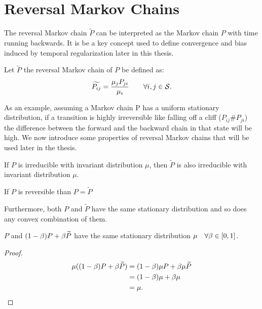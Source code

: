 \section{Reversal Markov Chains}
The reversal Markov chain $\widetilde{P}$ can be interpreted as the Markov chain $P$ with time running backwards. It is be a key concept used to define convergence and bias induced by temporal regularization later in this thesis. 
\begin{definition}
Let $\widetilde{P}$ the reversal Markov chain of $P$ be defined as:
\begin{equation}
    \widetilde{P_{ij}} = \frac{\mu_j P_{ji}}{\mu_i} \qquad \forall i,j \in \mathcal{S}.
\end{equation}
\end{definition}
As an example, assuming a Markov chain P has a uniform stationary distribution, if a transition is highly irreversible like falling off a cliff ($P_{ij} \# P_{ji}$) the difference between the forward and the backward chain in that state will be high. We now introduce some properties of reversal Markov chains that will be used later in the thesis.
\begin{remark}
If $P$ is irreducible with invariant distribution $\mu$, then $\widetilde{P}$ is also irreducible with invariant distribution $\mu$.
\end{remark}

\begin{remark}
If $P$ is reversible than $P = \widetilde{P}$
\end{remark}
Furthermore, both $P$ and $\widetilde{P}$ have the same stationary distribution and so does any convex combination of them.

\begin{lemma}
$P$ and $(1-\beta) P + \beta \widetilde{P}$ have the same stationary distribution $\mu \quad \forall \beta \in [0,1]$.
\end{lemma}
\begin{proof}
\begin{equation}
    \begin{split}
        \mu ( (1-\beta) P + \beta \widetilde{P}) &=  (1-\beta) \mu P + \beta \mu \widetilde{P} \\
        &= (1-\beta)\mu + \beta \mu\\
        &= \mu.
    \end{split}
\end{equation}
\end{proof}


